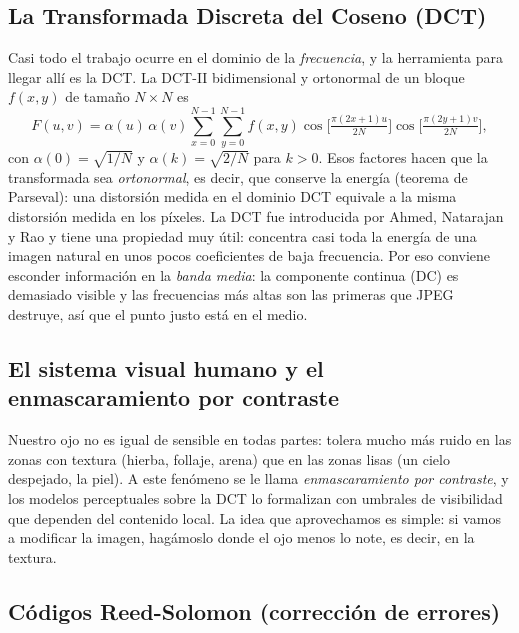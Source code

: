 \documentclass[12pt,a4paper]{article}
\renewcommand{\nobreakdash}{}
\begin{document}
\subsection{La Transformada Discreta del Coseno (DCT)}

Casi todo el trabajo ocurre en el dominio de la \emph{frecuencia}, y la herramienta para
llegar allí es la DCT. La DCT\nobreakdash-II bidimensional y ortonormal de un bloque
$f(x,y)$ de tamaño $N\times N$ es
\begin{equation}
F(u,v) = \alpha(u)\,\alpha(v)\sum_{x=0}^{N-1}\sum_{y=0}^{N-1} f(x,y)
\cos\!\Big[\tfrac{\pi(2x+1)u}{2N}\Big]
\cos\!\Big[\tfrac{\pi(2y+1)v}{2N}\Big],
\end{equation}
con $\alpha(0)=\sqrt{1/N}$ y $\alpha(k)=\sqrt{2/N}$ para $k>0$. Esos factores hacen que la
transformada sea \emph{ortonormal}, es decir, que conserve la energía (teorema de
Parseval): una distorsión medida en el dominio DCT equivale a la misma distorsión medida
en los píxeles. La DCT fue introducida por Ahmed, Natarajan y Rao \cite{ahmed1974} y tiene
una propiedad muy útil: concentra casi toda la energía de una imagen natural en unos pocos
coeficientes de baja frecuencia. Por eso conviene esconder información en la
\emph{banda media}: la componente continua (DC) es demasiado visible y las frecuencias más
altas son las primeras que JPEG destruye, así que el punto justo está en el medio.

\subsection{El sistema visual humano y el enmascaramiento por contraste}

Nuestro ojo no es igual de sensible en todas partes: tolera mucho más ruido en las zonas
con textura (hierba, follaje, arena) que en las zonas lisas (un cielo despejado, la piel).
A este fenómeno se le llama \emph{enmascaramiento por contraste}, y los modelos
perceptuales sobre la DCT \cite{watson1993} lo formalizan con umbrales de visibilidad que
dependen del contenido local. La idea que aprovechamos es simple: si vamos a modificar la
imagen, hagámoslo donde el ojo menos lo note, es decir, en la textura.

\subsection{Códigos Reed\nobreakdash-Solomon (corrección de errores)}
\end{document}
